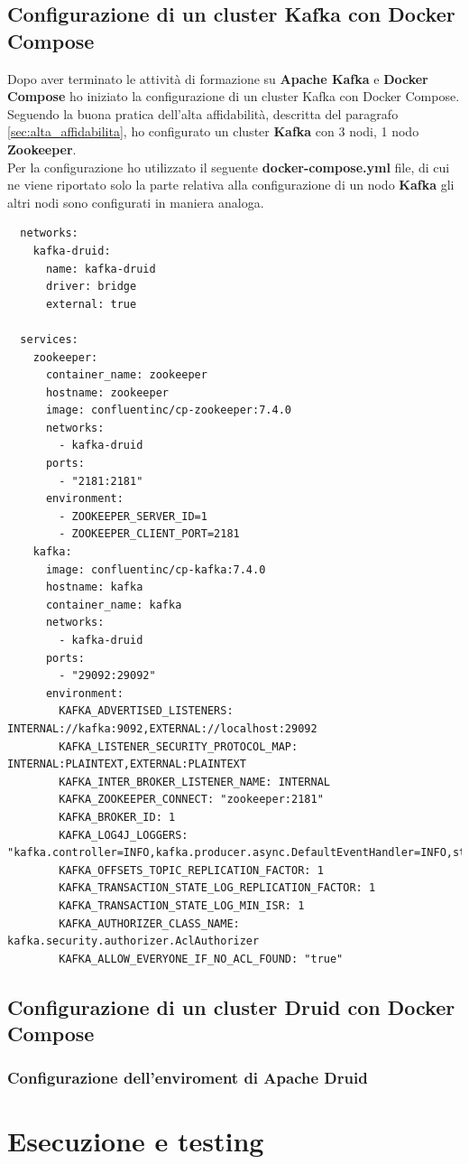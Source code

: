 \subsection{Configurazione di un cluster Kafka con Docker Compose}
Dopo aver terminato le attività di formazione su \textbf{Apache Kafka} e \textbf{Docker Compose} 
ho iniziato la configurazione di un cluster Kafka con Docker Compose. 
\\Seguendo la buona pratica dell'alta affidabilità, descritta del 
paragrafo \ref{sec:alta_affidabilita}, ho configurato un cluster \textbf{Kafka} con 3 nodi, 1 nodo \textbf{Zookeeper}.\\
Per la configurazione ho utilizzato il seguente \textbf{docker-compose.yml} file, di cui ne viene riportato solo la parte relativa alla configurazione di un nodo \textbf{Kafka} gli altri nodi sono configurati in maniera analoga.
\begin{lstlisting}
  networks:
    kafka-druid:
      name: kafka-druid
      driver: bridge
      external: true
  
  services:
    zookeeper:
      container_name: zookeeper
      hostname: zookeeper
      image: confluentinc/cp-zookeeper:7.4.0
      networks: 
        - kafka-druid
      ports:
        - "2181:2181"
      environment:
        - ZOOKEEPER_SERVER_ID=1
        - ZOOKEEPER_CLIENT_PORT=2181
    kafka:
      image: confluentinc/cp-kafka:7.4.0
      hostname: kafka
      container_name: kafka
      networks:
        - kafka-druid
      ports:
        - "29092:29092"
      environment:
        KAFKA_ADVERTISED_LISTENERS: INTERNAL://kafka:9092,EXTERNAL://localhost:29092
        KAFKA_LISTENER_SECURITY_PROTOCOL_MAP: INTERNAL:PLAINTEXT,EXTERNAL:PLAINTEXT
        KAFKA_INTER_BROKER_LISTENER_NAME: INTERNAL
        KAFKA_ZOOKEEPER_CONNECT: "zookeeper:2181"
        KAFKA_BROKER_ID: 1
        KAFKA_LOG4J_LOGGERS: "kafka.controller=INFO,kafka.producer.async.DefaultEventHandler=INFO,state.change.logger=INFO"
        KAFKA_OFFSETS_TOPIC_REPLICATION_FACTOR: 1
        KAFKA_TRANSACTION_STATE_LOG_REPLICATION_FACTOR: 1
        KAFKA_TRANSACTION_STATE_LOG_MIN_ISR: 1
        KAFKA_AUTHORIZER_CLASS_NAME: kafka.security.authorizer.AclAuthorizer
        KAFKA_ALLOW_EVERYONE_IF_NO_ACL_FOUND: "true"  
\end{lstlisting}    



\subsection{Configurazione di un cluster Druid con Docker Compose}
\subsubsection{Configurazione dell'enviroment di Apache Druid}

\section{Esecuzione e testing}
\newpage
\pagestyle{empty}
\null %
\newpage